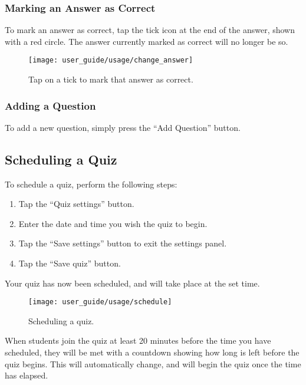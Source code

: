 \subsubsection{Marking an Answer as Correct} %
\label{ssub:marking_an_answer_as_correct}
To mark an answer as correct, tap the tick icon at the end of the answer, shown with a red circle. The answer currently marked as correct will no longer be so.
\begin{figure}[h!]
  \centering
  \texttt{[image: user\_guide/usage/change\_answer]}
  \caption{Tap on a tick to mark that answer as correct.}
\end{figure}

\subsubsection{Adding a Question} %
\label{ssub:adding_a_question}
To add a new question, simply press the ``Add Question'' button.


\subsection{Scheduling a Quiz} %
\label{sub:scheduling_a_quiz}
To schedule a quiz, perform the following steps:

\begin{enumerate}
\item Tap the ``Quiz settings'' button.
\item Enter the date and time you wish the quiz to begin.
\item Tap the ``Save settings'' button to exit the settings panel.
\item Tap the ``Save quiz'' button.
\end{enumerate}

Your quiz has now been scheduled, and will take place at the set time.
\begin{figure}[h!]
  \centering
  \texttt{[image: user\_guide/usage/schedule]}
  \caption{Scheduling a quiz.}
\end{figure}

When students join the quiz at least 20 minutes before the time you have scheduled, they will be met with a countdown showing how long is left before the quiz begins. This will automatically change, and will begin the quiz once the time has elapsed.

